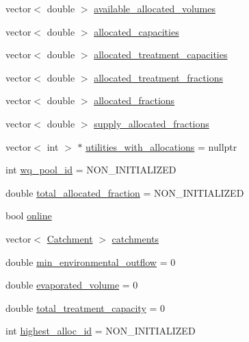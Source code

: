 \begin{DoxyCompactItemize}
\item 
vector$<$ double $>$ \mbox{\hyperlink{classWaterSource_a77d3fe9ea445fc987b07debdfb9e2f5b_a77d3fe9ea445fc987b07debdfb9e2f5b}{available\+\_\+allocated\+\_\+volumes}}
\item 
vector$<$ double $>$ \mbox{\hyperlink{classWaterSource_ab94063d51314cfb896010408ae32fa9c_ab94063d51314cfb896010408ae32fa9c}{allocated\+\_\+capacities}}
\item 
vector$<$ double $>$ \mbox{\hyperlink{classWaterSource_a87dc0bfb5cf4e2b9a953c7a80058c923_a87dc0bfb5cf4e2b9a953c7a80058c923}{allocated\+\_\+treatment\+\_\+capacities}}
\item 
vector$<$ double $>$ \mbox{\hyperlink{classWaterSource_aa73fe10cfc6579b2fb79529e1dde5140_aa73fe10cfc6579b2fb79529e1dde5140}{allocated\+\_\+treatment\+\_\+fractions}}
\item 
vector$<$ double $>$ \mbox{\hyperlink{classWaterSource_a2f6655a80c4847fe039987255d9d998c_a2f6655a80c4847fe039987255d9d998c}{allocated\+\_\+fractions}}
\item 
vector$<$ double $>$ \mbox{\hyperlink{classWaterSource_a87535be59994b2602576cdf34dbe04b9_a87535be59994b2602576cdf34dbe04b9}{supply\+\_\+allocated\+\_\+fractions}}
\item 
vector$<$ int $>$ $\ast$ \mbox{\hyperlink{classWaterSource_ac345583fc2d0f7e1db31ee40244d7ace_ac345583fc2d0f7e1db31ee40244d7ace}{utilities\+\_\+with\+\_\+allocations}} = nullptr
\item 
int \mbox{\hyperlink{classWaterSource_acef73d9b1675fb6db9ec39347514db6d_acef73d9b1675fb6db9ec39347514db6d}{wq\+\_\+pool\+\_\+id}} = N\+O\+N\+\_\+\+I\+N\+I\+T\+I\+A\+L\+I\+Z\+ED
\item 
double \mbox{\hyperlink{classWaterSource_a4be6864dc196287bdf8329b3aa6ca662_a4be6864dc196287bdf8329b3aa6ca662}{total\+\_\+allocated\+\_\+fraction}} = N\+O\+N\+\_\+\+I\+N\+I\+T\+I\+A\+L\+I\+Z\+ED
\item 
bool \mbox{\hyperlink{classWaterSource_aef4e289b47c2360f2e991ea3ee535781_aef4e289b47c2360f2e991ea3ee535781}{online}}
\item 
vector$<$ \mbox{\hyperlink{classCatchment}{Catchment}} $>$ \mbox{\hyperlink{classWaterSource_a8c18c34f23f8a06685c1d12f462ed830_a8c18c34f23f8a06685c1d12f462ed830}{catchments}}
\item 
double \mbox{\hyperlink{classWaterSource_adae67ac96597e4b25332002b88a9a52b_adae67ac96597e4b25332002b88a9a52b}{min\+\_\+environmental\+\_\+outflow}} = 0
\item 
double \mbox{\hyperlink{classWaterSource_a6085899c4b4cc40fa80784203e1a9755_a6085899c4b4cc40fa80784203e1a9755}{evaporated\+\_\+volume}} = 0
\item 
double \mbox{\hyperlink{classWaterSource_a2fdfd5ff7d103e71108cf2a31babaccb_a2fdfd5ff7d103e71108cf2a31babaccb}{total\+\_\+treatment\+\_\+capacity}} = 0
\item 
int \mbox{\hyperlink{classWaterSource_a83c6dcf19b64533ce4bc3b918ce6cc8e_a83c6dcf19b64533ce4bc3b918ce6cc8e}{highest\+\_\+alloc\+\_\+id}} = N\+O\+N\+\_\+\+I\+N\+I\+T\+I\+A\+L\+I\+Z\+ED
\end{DoxyCompactItemize}
